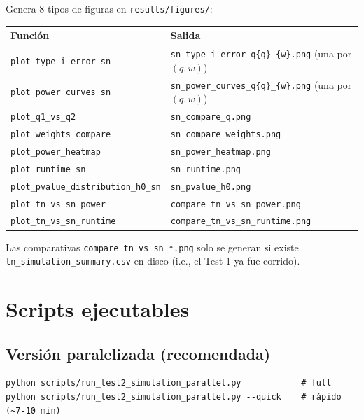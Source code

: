 \documentclass[11pt,a4paper]{article}
\begin{document}
Genera 8 tipos de figuras en \texttt{results/figures/}:

\begin{center}\small
\begin{tabular}{@{}ll@{}}
\toprule
Función & Salida \\
\midrule
\texttt{plot\_type\_i\_error\_sn}        & \texttt{sn\_type\_i\_error\_q\{q\}\_\{w\}.png} (una por $(q,w)$) \\
\texttt{plot\_power\_curves\_sn}         & \texttt{sn\_power\_curves\_q\{q\}\_\{w\}.png} (una por $(q,w)$) \\
\texttt{plot\_q1\_vs\_q2}                & \texttt{sn\_compare\_q.png} \\
\texttt{plot\_weights\_compare}          & \texttt{sn\_compare\_weights.png} \\
\texttt{plot\_power\_heatmap}            & \texttt{sn\_power\_heatmap.png} \\
\texttt{plot\_runtime\_sn}               & \texttt{sn\_runtime.png} \\
\texttt{plot\_pvalue\_distribution\_h0\_sn} & \texttt{sn\_pvalue\_h0.png} \\
\texttt{plot\_tn\_vs\_sn\_power}         & \texttt{compare\_tn\_vs\_sn\_power.png} \\
\texttt{plot\_tn\_vs\_sn\_runtime}       & \texttt{compare\_tn\_vs\_sn\_runtime.png} \\
\bottomrule
\end{tabular}
\end{center}

Las comparativas \texttt{compare\_tn\_vs\_sn\_*.png} solo se generan si
existe \texttt{tn\_simulation\_summary.csv} en disco (i.e., el Test 1
ya fue corrido).

\section{Scripts ejecutables}

\subsection{Versión paralelizada (recomendada)}
\begin{lstlisting}[style=shellstyle]
python scripts/run_test2_simulation_parallel.py            # full
python scripts/run_test2_simulation_parallel.py --quick    # rápido (~7-10 min)
\end{lstlisting}
\end{document}
